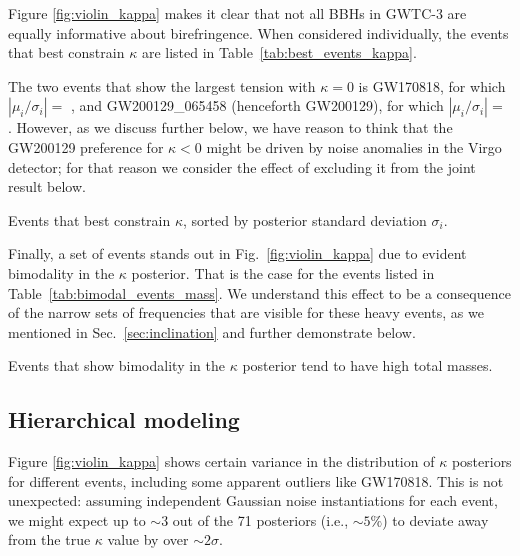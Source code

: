 \documentclass[aps,prd,twocolumn,superscriptaddress,preprintnumbers,floatfix,nofootinbib]{revtex4-2}
\begin{document}
Figure \ref{fig:violin_kappa} makes it clear that not all \acp{BBH} in GWTC-3 are equally informative about birefringence.
When considered individually, the events that best constrain $\kappa$ are listed in Table~\ref{tab:best_events_kappa}.

The two events that show the largest tension with $\kappa = 0$ is GW170818, for which $|\mu_i / \sigma_i| =$ , and GW200129\_065458 (henceforth GW200129), for which $|\mu_i / \sigma_i| =$ .
However, as we discuss further below, we have reason to think that the GW200129 preference for $\kappa < 0$ might be driven by noise anomalies in the Virgo detector; for that reason we consider the effect of excluding it from the joint result below.

\begin{table}
    \caption{Events that best constrain $\kappa$, sorted by posterior standard deviation $\sigma_i$.}
    \begin{ruledtabular}
    \end{ruledtabular}
    \label{tab:best_events_kappa}
\end{table}

Finally, a set of events stands out in Fig.~\ref{fig:violin_kappa} due to evident bimodality in the $\kappa$ posterior.
That is the case for the events listed in Table~\ref{tab:bimodal_events_mass}.
We understand this effect to be a consequence of the narrow sets of frequencies that are visible for these heavy events, as we mentioned in Sec.~\ref{sec:inclination} and further demonstrate below.

\begin{table}
    \caption{Events that show bimodality in the $\kappa$ posterior tend to have high total masses.}
    \begin{ruledtabular}
    \end{ruledtabular}
    \label{tab:bimodal_events_mass}
\end{table}

\subsection{Hierarchical modeling}
\label{sec:results:hier}

Figure \ref{fig:violin_kappa} shows certain variance in the distribution of $\kappa$ posteriors for different events, including some apparent outliers like GW170818.
This is not unexpected: assuming independent Gaussian noise instantiations for each event, we might expect up to ${\sim}3$ out of the 71 posteriors (i.e., ${\sim}5\%$) to deviate away from the true $\kappa$ value by over ${\sim}2\sigma$.
\end{document}
